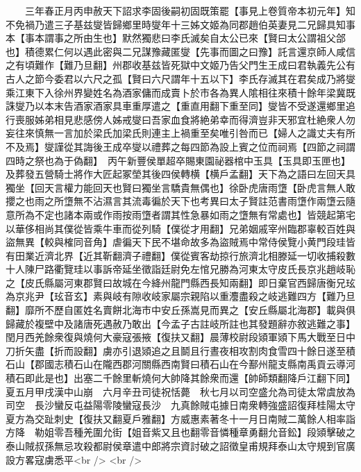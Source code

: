 　　三年春正月丙申赦天下詔求李固後嗣初固既策罷【事見上卷質帝本初元年】知不免禍乃遣三子基兹燮皆歸鄉里時燮年十三姊文姬為同郡趙伯英妻見二兄歸具知事本【事本謂事之所由生也】默然獨悲曰李氏滅矣自太公已來【賢曰太公謂祖父郃也】積德累仁何以遇此密與二兄謀豫藏匿燮【先事而圖之曰豫】託言還京師人咸信之有頃難作【難乃旦翻】州郡收基兹皆死獄中文姬乃告父門生王成曰君執義先公有古人之節今委君以六尺之孤【賢曰六尺謂年十五以下】李氏存滅其在君矣成乃將燮乘江東下入徐州界變姓名為酒家傭而成賣卜於市各為異人隂相往來積十餘年梁冀既誅燮乃以本末告酒家酒家具車重厚遣之【重直用翻下重至同】燮皆不受遂還鄉里追行喪服姊弟相見悲感傍人姊戒燮曰吾家血食將絶弟幸而得濟豈非天邪宜杜絶衆人勿妄往來慎無一言加於梁氏加梁氏則連主上禍重至矣唯引咎而已【婦人之識丈夫有所不及焉】燮謹從其誨後王成卒燮以禮葬之每四節為設上賓之位而祠焉【四節之祠謂四時之祭也為于偽翻】　丙午新豐侯單超卒賜東園祕器棺中玉具【玉具即玉匣也】及葬發五營騎士將作大匠起冢塋其後四侯轉横【横戶孟翻】天下為之語曰左回天具獨坐【回天言權力能回天也賢曰獨坐言驕貴無偶也】徐卧虎唐雨墯【卧虎言無人敢攖之也雨之所墯無不沾濕言其流毒徧於天下也考異曰太子賢註范書雨墯作兩墯云隨意所為不定也諸本兩或作雨按雨墯者謂其性急暴如雨之墯無有常處也】皆競起第宅以華侈相尚其僕從皆乘牛車而從列騎【僕從才用翻】兄弟姻戚宰州臨郡辜較百姓與盜無異【較與榷同音角】虐徧天下民不堪命故多為盜賊焉中常侍侯覽小黄門段珪皆有田業近濟北界【近其靳翻濟子禮翻】僕從賓客劫掠行旅濟北相滕延一切收捕殺數十人陳尸路衢覽珪以事訴帝延坐徵詣廷尉免左悺兄勝為河東太守皮氏長京兆趙岐恥之【皮氏縣屬河東郡賢曰故城在今絳州龍門縣西長知兩翻】即日棄官西歸唐衡兄玹為京兆尹【玹音玄】素與岐有隙收岐家屬宗親陷以重灋盡殺之岐逃難四方【難乃旦翻】靡所不歷自匿姓名賣餅北海市中安丘孫嵩見而異之【安丘縣屬北海郡】載與俱歸藏於複壁中及諸唐死遇赦乃敢出【今孟子古註岐所註也其發題辭亦敘逃難之事】　閏月西羌餘衆復與燒何大豪寇張掖【復扶又翻】晨薄校尉段熲軍熲下馬大戰至日中刀折矢盡【折而設翻】虜亦引退熲追之且鬬且行晝夜相攻割肉食雪四十餘日遂至積石山【郡國志積石山在隴西郡河關縣西南賢曰積石山在今鄯州龍支縣南禹貢云導河積石即此是也】出塞二千餘里斬燒何大帥降其餘衆而還【帥師類翻降戶江翻下同】　夏五月甲戌漢中山崩　六月辛丑司徒祝恬薨　秋七月以司空盛允為司徒太常虞放為司空　長沙蠻反屯益陽零陵蠻寇長沙　九真餘賊屯據日南衆轉強盛詔復拜桂陽太守夏方為交趾刺史【復扶又翻夏戶雅翻】方威惠素著冬十一月日南賊二萬餘人相率詣方降　勒姐零吾種羌圍允街【姐音紫又且也翻零音憐種章勇翻允音鈆】段熲擊破之　泰山賊叔孫無忌攻殺都尉侯章遣中郎將宗資討破之詔徵皇甫規拜泰山太守規到官廣設方畧寇虜悉平<br />
<br />
